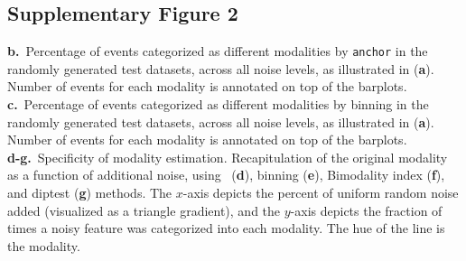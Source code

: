 \subsection{Supplementary Figure 2}


\begin{minipage}{\textwidth}
\vspace{-10pt}
\textbf{b.}~Percentage of events categorized as different modalities by \texttt{anchor} in the randomly generated test datasets, across all noise levels, as illustrated in (\textbf{a}). Number of events for each modality is annotated on top of the barplots. \\
\textbf{c.}~Percentage of events categorized as different modalities by binning in the randomly generated test datasets, across all noise levels, as illustrated in (\textbf{a}). Number of events for each modality is annotated on top of the barplots. \\
\textbf{d-g.}~Specificity of modality estimation. Recapitulation of the original modality as a function of additional noise, using \anchor\, (\textbf{d}), binning (\textbf{e}), Bimodality index (\textbf{f}), and diptest (\textbf{g}) methods. The $x$-axis depicts the percent of uniform random noise added (visualized as a triangle gradient), and the $y$-axis depicts the fraction of times a noisy feature was categorized into each modality. The hue of the line is the modality. \\

\end{minipage}
